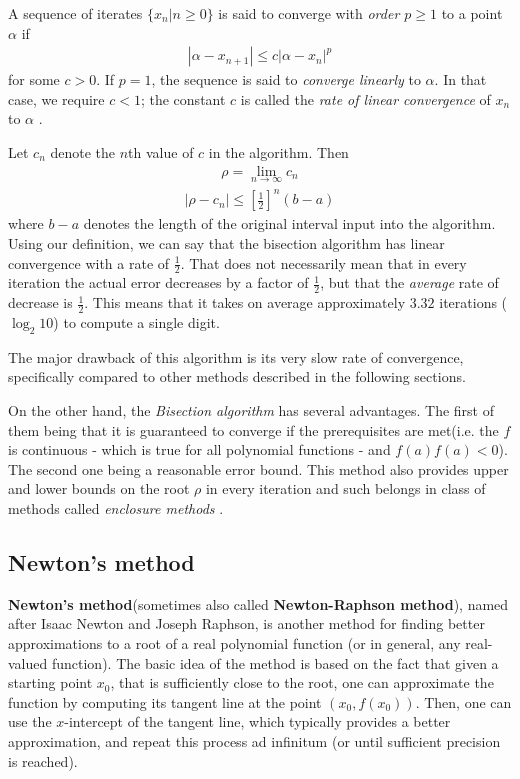 \documentclass[
  digital, %
  table,   %
  nolof,     %
  nolot,     %
	draft, %
]{fithesis3}
\begin{document}
\begin{definition}
  A sequence of iterates $\{ x_{n} | n \geq 0\}$ is said to converge with \textit{order $p \geq 1$} to a point $\alpha$ if
	\begin{align}
      |\alpha - x_{n + 1}| \leq c |\alpha - x_{n}|^{p}  \tag*{$n \geq 0$} 
	\end{align}
	for some $c > 0$. If $p = 1$, the sequence is said to \textit{converge linearly} to $\alpha$. In that case, we require $c < 1$; the constant $c$ is called the \textit{rate of linear convergence} of $x_{n}$ to $\alpha$ \parencite[p.~56]{rootApproxMeth}.
	\label{def:converg}
\end{definition}
Let $c_{n}$ denote the $n$th value of $c$ in the algorithm. Then 
\begin{align}
      \rho = \lim_{n\to\infty} c_{n}
\end{align}
\begin{align}
      |\rho - c_{n}| \leq \left[\frac{1}{2}\right]^n (b - a)
\end{align}
where $b - a$ denotes the length of the original interval input into the algorithm. Using our definition, we can say that the bisection algorithm has linear convergence with a rate of $\frac{1}{2}$. That does not necessarily mean that in every iteration the actual error decreases by a factor of $\frac{1}{2}$, but that the \textit{average} rate of decrease is $\frac{1}{2}$. This means that it takes on average approximately $3.32$ iterations ($\log_2 10$) to compute a single digit.

The major drawback of this algorithm is its very slow rate of convergence, specifically compared to other methods described in the following sections.

On the other hand, the \textit{Bisection algorithm} has several advantages. The first of them being that it is guaranteed to converge if the prerequisites are met(i.e. the $f$ is continuous - which is true for all polynomial functions - and $f(a)f(a) < 0$). The second one being a reasonable error bound. This method also provides upper and lower bounds on the root $\rho$ in every iteration and such belongs in class of methods called \textit{enclosure methods} \parencite{rootApproxMeth}.


\subsection{Newton's method}
\textbf{Newton's method}(sometimes also called \textbf{Newton-Raphson method}), named after Isaac Newton and Joseph Raphson, is another method for finding better approximations to a root of a real polynomial function (or in general, any real-valued function). The basic idea of the method is based on the fact that given a starting point $x_{0}$, that is sufficiently close to the root, one can approximate the function by computing its tangent line at the point $(x_{0}, f(x_{0}))$. Then, one can use the $x$-intercept of the tangent line, which typically provides a better approximation, and repeat this process ad infinitum \parencite{rootApproxMeth} (or until sufficient precision is reached). 
\end{document}
